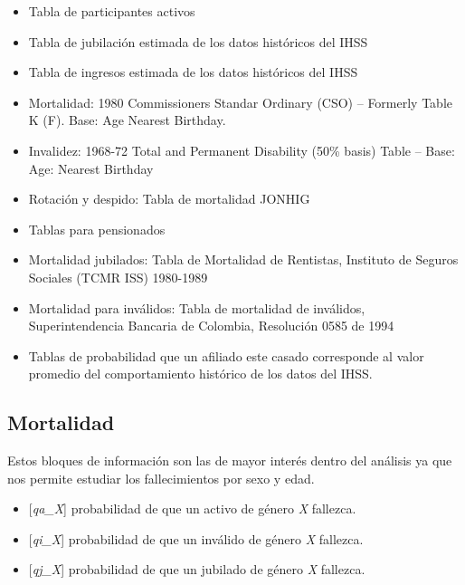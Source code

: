 \documentclass[
  letterpaper,
  DIV=11,
  numbers=noendperiod]{scrreprt}
\providecommand{\tightlist}{%
  \setlength{\itemsep}{0pt}\setlength{\parskip}{0pt}}\usepackage{longtable,booktabs,array}
\begin{document}
\begin{itemize}
\tightlist
\item
  Tabla de participantes activos
\item
  Tabla de jubilación estimada de los datos históricos del IHSS
\item
  Tabla de ingresos estimada de los datos históricos del IHSS
\item
  Mortalidad: 1980 Commissioners Standar Ordinary (CSO) -- Formerly
  Table K (F). Base: Age Nearest Birthday.
\item
  Invalidez: 1968-72 Total and Permanent Disability (50\% basis) Table
  -- Base: Age: Nearest Birthday
\item
  Rotación y despido: Tabla de mortalidad JONHIG
\item
  Tablas para pensionados
\item
  Mortalidad jubilados: Tabla de Mortalidad de Rentistas, Instituto de
  Seguros Sociales (TCMR ISS) 1980-1989
\item
  Mortalidad para inválidos: Tabla de mortalidad de inválidos,
  Superintendencia Bancaria de Colombia, Resolución 0585 de 1994
\item
  Tablas de probabilidad que un afiliado este casado corresponde al
  valor promedio del comportamiento histórico de los datos del IHSS.
\end{itemize}

\hypertarget{mortalidad}{%
\subsection{Mortalidad}\label{mortalidad}}

Estos bloques de información son las de mayor interés dentro del
análisis ya que nos permite estudiar los fallecimientos por sexo y edad.

\begin{itemize}
\tightlist
\item
  {[}\emph{qa\_X}{]} probabilidad de que un activo de género \emph{X}
  fallezca.
\item
  {[}\emph{qi\_X}{]} probabilidad de que un inválido de género \emph{X}
  fallezca.
\item
  {[}\emph{qj\_X}{]} probabilidad de que un jubilado de género \emph{X}
  fallezca.
\end{itemize}
\end{document}

